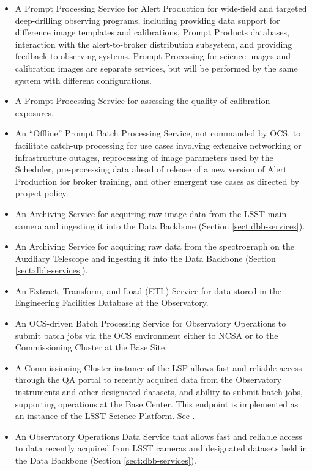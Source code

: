 \begin{itemize}
\item  A Prompt Processing Service for Alert Production for wide-field and
targeted deep-drilling observing programs, including providing data support for
difference image templates and calibrations, Prompt Products databases, interaction with
the alert-to-broker distribution subsystem, and providing feedback to observing systems. Prompt Processing for science images and calibration images are separate services, but will be performed by the same system with different configurations. 
\item  A Prompt Processing Service for assessing the quality of 
calibration exposures.
\item  An “Offline” Prompt Batch Processing Service, not commanded by OCS, to
facilitate catch-up processing for use cases involving extensive networking or
infrastructure outages, reprocessing of image parameters used by the Scheduler,
pre-processing data ahead of release of a new version of Alert Production for broker training, and other
emergent use cases as directed by project policy. 
\item  An Archiving Service for acquiring raw image data from the LSST main
camera and ingesting it into the Data Backbone (Section \ref{sect:dbb-services}).
\item  An Archiving Service for acquiring raw data from the spectrograph on the
Auxiliary Telescope and ingesting it into the Data Backbone (Section \ref{sect:dbb-services}).
\item  An Extract, Transform, and Load (ETL) Service for data stored in the
Engineering Facilities Database at the Observatory.
\item  An OCS-driven Batch Processing Service for Observatory Operations to
submit batch jobs via the OCS environment either to NCSA or to the Commissioning
Cluster at the Base Site.
\item  A Commissioning Cluster instance of the LSP allows fast and reliable access
through the QA portal to recently acquired data from the Observatory instruments
and other designated datasets, and ability to submit batch jobs, supporting
operations at the Base Center.  This endpoint is implemented as an instance of
the LSST Science Platform. See .
\item  An Observatory Operations Data Service that allows fast and reliable
access to data recently acquired from LSST cameras and designated datasets held
in the Data Backbone (Section \ref{sect:dbb-services}).
\end{itemize}

